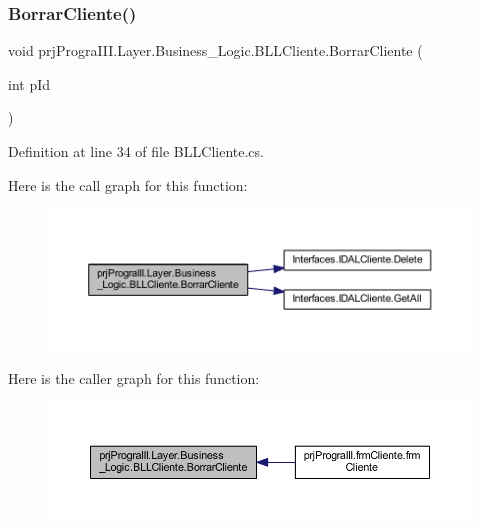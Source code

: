 \subsubsection{\texorpdfstring{Borrar\+Cliente()}{BorrarCliente()}}
{\footnotesize\ttfamily void prj\+Progra\+I\+I\+I.\+Layer.\+Business\+\_\+\+Logic.\+B\+L\+L\+Cliente.\+Borrar\+Cliente (\begin{DoxyParamCaption}\item[{int}]{p\+Id }\end{DoxyParamCaption})}



Definition at line 34 of file B\+L\+L\+Cliente.\+cs.

Here is the call graph for this function\+:
\nopagebreak
\begin{figure}[H]
\begin{center}
\leavevmode
\includegraphics[width=350pt]{classprj_progra_i_i_i_1_1_layer_1_1_business___logic_1_1_b_l_l_cliente_a11c1c268ae9a534cb7a3ff7f46d66f3e_cgraph}
\end{center}
\end{figure}
Here is the caller graph for this function\+:
\nopagebreak
\begin{figure}[H]
\begin{center}
\leavevmode
\includegraphics[width=350pt]{classprj_progra_i_i_i_1_1_layer_1_1_business___logic_1_1_b_l_l_cliente_a11c1c268ae9a534cb7a3ff7f46d66f3e_icgraph}
\end{center}
\end{figure}
\hypertarget{classprj_progra_i_i_i_1_1_layer_1_1_business___logic_1_1_b_l_l_cliente_a6a228925ac2fdaf460a0921a58a80df4}{}\label{classprj_progra_i_i_i_1_1_layer_1_1_business___logic_1_1_b_l_l_cliente_a6a228925ac2fdaf460a0921a58a80df4} 
